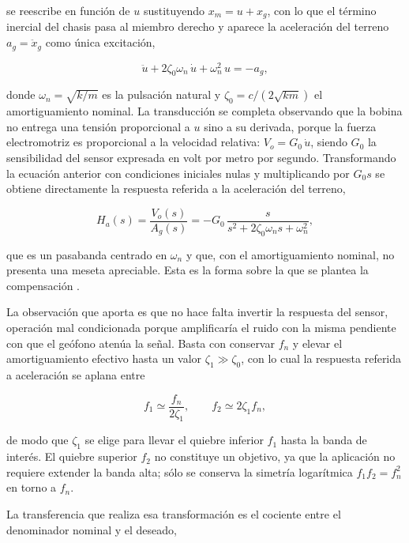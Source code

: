 se reescribe en función de $u$ sustituyendo $x_m=u+x_g$, con lo que el término inercial del chasis pasa al miembro derecho y aparece la aceleración del terreno $a_g=\ddot{x}_g$ como única excitación,

\begin{equation}
\ddot{u}+2\zeta_0\omega_n\,\dot{u}+\omega_n^{2}\,u=-a_g,
\end{equation}

donde $\omega_n=\sqrt{k/m}$ es la pulsación natural y $\zeta_0=c/(2\sqrt{km})$ el amortiguamiento nominal. La transducción se completa observando que la bobina no entrega una tensión proporcional a $u$ sino a su derivada, porque la fuerza electromotriz es proporcional a la velocidad relativa: $V_o=G_0\,\dot{u}$, siendo $G_0$ la sensibilidad del sensor expresada en volt por metro por segundo. Transformando la ecuación anterior con condiciones iniciales nulas y multiplicando por $G_0 s$ se obtiene directamente la respuesta referida a la aceleración del terreno,

\begin{equation}
H_a(s)=\frac{V_o(s)}{A_g(s)}=-G_0\,\frac{s}{s^{2}+2\zeta_0\omega_n s+\omega_n^{2}},
\end{equation}

que es un pasabanda centrado en $\omega_n$ y que, con el amortiguamiento nominal, no presenta una meseta apreciable. Esta es la forma sobre la que se plantea la compensación .

La observación que aporta  es que no hace falta invertir la respuesta del sensor, operación mal condicionada porque amplificaría el ruido con la misma pendiente con que el geófono atenúa la señal. Basta con conservar $f_n$ y elevar el amortiguamiento efectivo hasta un valor $\zeta_1\gg\zeta_0$, con lo cual la respuesta referida a aceleración se aplana entre

\begin{equation}
f_1\simeq\frac{f_n}{2\zeta_1},
\qquad
f_2\simeq 2\zeta_1 f_n,
\end{equation}

de modo que $\zeta_1$ se elige para llevar el quiebre inferior $f_1$ hasta la banda de interés. El quiebre superior $f_2$ no constituye un objetivo, ya que la aplicación no requiere extender la banda alta; sólo se conserva la simetría logarítmica $f_1f_2=f_n^{2}$ en torno a $f_n$.

La transferencia que realiza esa transformación es el cociente entre el denominador nominal y el deseado,

